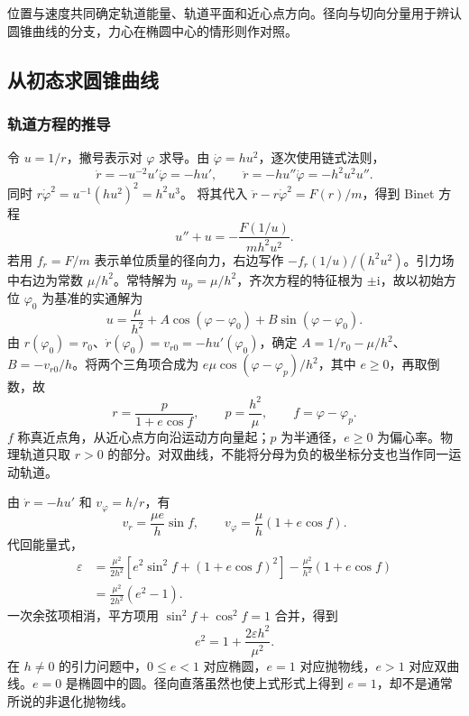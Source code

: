 位置与速度共同确定轨道能量、轨道平面和近心点方向。径向与切向分量用于辨认圆锥曲线的分支，力心在椭圆中心的情形则作对照。



\subsection{从初态求圆锥曲线}
\subsubsection{轨道方程的推导}

令 $u=1/r$，撇号表示对 $\varphi$ 求导。由 $\dot\varphi=hu^2$，逐次使用链式法则，
\[
\dot r=-u^{-2}u'\dot\varphi=-hu',\qquad
\ddot r=-hu''\dot\varphi=-h^2u^2u''.
\]
同时 $r\dot\varphi^2=u^{-1}(hu^2)^2=h^2u^3$。
将其代入 $\ddot r-r\dot\varphi^2=F(r)/m$，得到 Binet 方程
\begin{equation}\label{sup8:eq:d8-binet}
 u''+u=-\frac{F(1/u)}{mh^2u^2}.
\end{equation}
若用 $f_r=F/m$ 表示单位质量的径向力，右边写作 $-f_r(1/u)/(h^2u^2)$。引力场中右边为常数 $\mu/h^2$。常特解为 $u_p=\mu/h^2$，齐次方程的特征根为 $\pm\mathrm i$，故以初始方位 $\varphi_0$ 为基准的实通解为
\[
u=\frac\mu{h^2}+A\cos(\varphi-\varphi_0)+B\sin(\varphi-\varphi_0).
\]
由 $r(\varphi_0)=r_0$、$\dot r(\varphi_0)=v_{r0}=-hu'(\varphi_0)$，确定 $A=1/r_0-\mu/h^2$、$B=-v_{r0}/h$。将两个三角项合成为 $e\mu\cos(\varphi-\varphi_p)/h^2$，其中 $e\ge0$，再取倒数，故
\begin{equation}\label{sup8:eq:d8-conic}
 r=\frac{p}{1+e\cos f},\qquad
 p=\frac{h^2}{\mu},\qquad f=\varphi-\varphi_p.
\end{equation}
$f$ 称真近点角，从近心点方向沿运动方向量起；$p$ 为半通径，$e\ge0$ 为偏心率。物理轨道只取 $r>0$ 的部分。对双曲线，不能将分母为负的极坐标分支也当作同一运动轨道。

由 $\dot r=-hu'$ 和 $v_\varphi=h/r$，有
\begin{equation}\label{sup8:eq:d8-velocities}
 v_r=\frac{\mu e}{h}\sin f,\qquad
 v_\varphi=\frac{\mu}{h}(1+e\cos f).
\end{equation}
代回能量式，
\[
\begin{aligned}
\varepsilon
&=\frac{\mu^2}{2h^2}\left[e^2\sin^2 f+(1+e\cos f)^2\right]
-\frac{\mu^2}{h^2}(1+e\cos f)\\
&=\frac{\mu^2}{2h^2}(e^2-1).
\end{aligned}
\]
一次余弦项相消，平方项用 $\sin^2 f+\cos^2 f=1$ 合并，得到
\begin{equation}\label{sup8:eq:d8-eccentricity}
 e^2=1+\frac{2\varepsilon h^2}{\mu^2}.
\end{equation}
在 $h\ne0$ 的引力问题中，$0\le e<1$ 对应椭圆，$e=1$ 对应抛物线，$e>1$ 对应双曲线。$e=0$ 是椭圆中的圆。径向直落虽然也使上式形式上得到 $e=1$，却不是通常所说的非退化抛物线。

